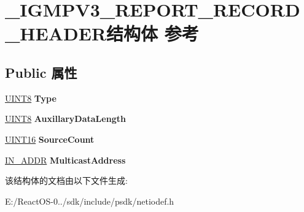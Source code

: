 \hypertarget{struct___i_g_m_p_v3___r_e_p_o_r_t___r_e_c_o_r_d___h_e_a_d_e_r}{}\section{\+\_\+\+I\+G\+M\+P\+V3\+\_\+\+R\+E\+P\+O\+R\+T\+\_\+\+R\+E\+C\+O\+R\+D\+\_\+\+H\+E\+A\+D\+E\+R结构体 参考}
\label{struct___i_g_m_p_v3___r_e_p_o_r_t___r_e_c_o_r_d___h_e_a_d_e_r}
\subsection*{Public 属性}
\begin{DoxyCompactItemize}
\item 
\mbox{\label{struct___i_g_m_p_v3___r_e_p_o_r_t___r_e_c_o_r_d___h_e_a_d_e_r_aa6214bf2103ee16d08d167cfa76e65b7}} 
\hyperlink{_processor_bind_8h_ab27e9918b538ce9d8ca692479b375b6a}{U\+I\+N\+T8} {\bfseries Type}
\item 
\mbox{\label{struct___i_g_m_p_v3___r_e_p_o_r_t___r_e_c_o_r_d___h_e_a_d_e_r_a06264345b1b3710f5361cad4f0937d37}} 
\hyperlink{_processor_bind_8h_ab27e9918b538ce9d8ca692479b375b6a}{U\+I\+N\+T8} {\bfseries Auxillary\+Data\+Length}
\item 
\mbox{\label{struct___i_g_m_p_v3___r_e_p_o_r_t___r_e_c_o_r_d___h_e_a_d_e_r_af5c1860a1431164aff479c9fb0fdf774}} 
\hyperlink{_processor_bind_8h_a09f1a1fb2293e33483cc8d44aefb1eb1}{U\+I\+N\+T16} {\bfseries Source\+Count}
\item 
\mbox{\label{struct___i_g_m_p_v3___r_e_p_o_r_t___r_e_c_o_r_d___h_e_a_d_e_r_aeec6958d216572f32f8d45909fe18911}} 
\hyperlink{structin__addr}{I\+N\+\_\+\+A\+D\+DR} {\bfseries Multicast\+Address}
\end{DoxyCompactItemize}


该结构体的文档由以下文件生成\+:\begin{DoxyCompactItemize}
\item 
E\+:/\+React\+O\+S-\/0../sdk/include/psdk/netiodef.\+h\end{DoxyCompactItemize}
